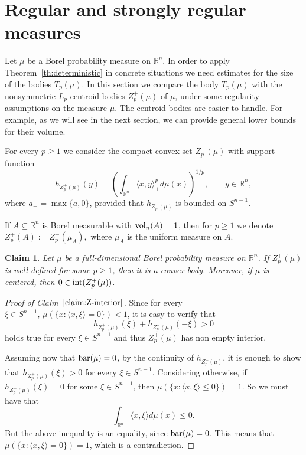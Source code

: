 \documentclass[11pt,leqno]{article}
\newtheorem{claim}[theorem]{Claim}
\theoremstyle{definition}
\theoremstyle{remark}
\numberwithin{equation}{section}
\newcommand{\vol}{{\rm vol}}
\newcommand{\ls}{\leqslant}
\newcommand{\gr}{\geqslant}
\newcommand{\1}{\textbf{1}}
\begin{document}
\section{Regular and strongly regular measures}\label{section-4}

Let $\mu$ be a Borel probability measure on $\mathbb R^n$.  In order to apply Theorem~\ref{th:deterministic} in concrete situations we need estimates for the size of the bodies $T_p(\mu)$. In this section we compare  the body $T_p(\mu)$
with the nonsymmetric $L_p$-centroid bodies $Z_p^+(\mu)$ of $\mu$, under some regularity assumptions on the measure $\mu$.
The centroid bodies are easier to handle. For example, as we will see in the next section, we can provide general lower
bounds for their volume.

For every $p\gr 1$ we consider the compact convex set $Z_p^+(\mu )$ with support function
\begin{equation*}h_{Z_p^+(\mu )}(y)=\left (\int_{{\mathbb R}^n}\langle
x,y\rangle_+^pd\mu(x)\right )^{1/p},\qquad y\in {\mathbb R}^n,\end{equation*} where $a_+=\max
\{a,0\}$, provided that $h_{Z_p^+(\mu )}$ is bounded on $S^{n-1}$.

If $A \subseteq \mathbb{R}^n$ is Borel measurable with $\vol_n(A)=1$, then for $p \gr 1$ we denote $Z_{p}^+(A) := Z_{p}^+(\mu_A),$ where $\mu_A$ is the uniform measure on $A$.

\begin{claim}\label{claim:Z-interior}Let $\mu$ be a full-dimensional Borel probability measure on $\mathbb R^n$. If $Z_{p}^+(\mu)$ is well defined for some $p \gr 1$, then it is a convex body. Moreover, if $\mu$ is centered, then $0 \in {\rm int}(Z_{p}^+(\mu))$.

\end{claim}

\begin{proof}[Proof of Claim~$\ref{claim:Z-interior}$] Since for every $\xi \in S^{n-1}, \, \mu(\{x:\langle x, \xi \rangle=0\})<1 $, it is easy to verify that
$$ h_{Z_{p}^+(\mu)}(\xi)+h_{Z_{p}^+(\mu)}(-\xi)>0$$
holds true for every $\xi \in S^{n-1}$ and thus $Z_{p}^+(\mu)$ has non empty interior.

Assuming now that $\rm{bar}(\mu)=0$, by the continuity of $h_{Z_{p}^+(\mu)}$, it is enough to show that $h_{Z_{p}^+(\mu)}(\xi)>0$ for every $\xi \in S^{n-1}$. Considering otherwise, if $h_{Z_{p}^+(\mu)}(\xi)=0$ for some $\xi \in S^{n-1}$, then $\mu(\{x: \langle x, \xi \rangle \ls 0\})=1$. So we must have that
$$\int_{\mathbb{R}^n} \langle x, \xi \rangle d\mu(x) \ls 0.$$
But the above inequality is an equality, since $\rm{bar}(\mu)=0$. This means that $\mu(\{x:\langle x,\xi \rangle=0\})=1$, which is a contradiction.
\end{proof}
\end{document}
